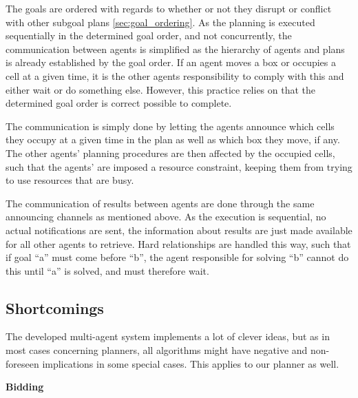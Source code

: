 \documentclass[Main]{subfiles}
\begin{document}
The goals are ordered with regards to whether or not they disrupt or conflict with other subgoal plans \autoref{sec:goal_ordering}. As the planning is executed sequentially in the determined goal order, and not concurrently, the communication between agents is simplified as the hierarchy of agents and plans is already established by the goal order. 
If an agent moves a box or occupies a cell at a given time, it is the other agents responsibility to comply with this and either wait or do something else. However, this practice relies on that the determined goal order is correct possible to complete. 

The communication is simply done by letting the agents announce which cells they occupy at a given time in the plan as well as which box they move, if any. The other agents' planning procedures are then affected by the occupied cells, such that the agents' are imposed a resource constraint, keeping them from trying to use resources that are busy. 

The communication of results between agents are done through the same announcing channels as mentioned above. As the execution is sequential, no actual notifications are sent, the information about results are just made available for all other agents to retrieve. Hard relationships are handled this way, such that if goal ``a'' must come before ``b'', the agent responsible for solving ``b'' cannot do this until ``a'' is solved, and must therefore wait. 




\subsection{Shortcomings}
The developed multi-agent system implements a lot of clever ideas, but as in most cases concerning planners, all algorithms might have negative and non-foreseen implications in some special cases. This applies to our planner as well. 


\textbf{Bidding}
\end{document}
